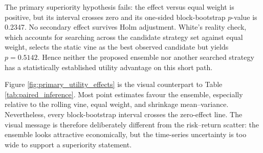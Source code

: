 \begin{table}[H]
\centering
\caption{Paired CRRA-Utility Effects of the Frozen TD3 Ensemble}
\label{tab:paired_inference}
\caption*{\footnotesize Notes: Effects are ensemble minus benchmark mean monthly CRRA utility. All intervals include zero. Training seeds are not used as independent market replications.}
\end{table}

The primary superiority hypothesis fails: the effect versus equal weight is positive, but its interval crosses zero and its one-sided block-bootstrap $p$-value is 0.2347. No secondary effect survives Holm adjustment. White's reality check, which accounts for searching across the candidate strategy set against equal weight, selects the static vine as the best observed candidate but yields $p=0.5142$. Hence neither the proposed ensemble nor another searched strategy has a statistically established utility advantage on this short path.

Figure \ref{fig:primary_utility_effects} is the visual counterpart to Table \ref{tab:paired_inference}. Most point estimates favour the ensemble, especially relative to the rolling vine, equal weight, and shrinkage mean--variance. Nevertheless, every block-bootstrap interval crosses the zero-effect line. The visual message is therefore deliberately different from the risk--return scatter: the ensemble looks attractive economically, but the time-series uncertainty is too wide to support a superiority statement.

